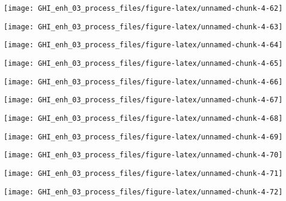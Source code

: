 \documentclass[
  10pt,
  a4paper,oneside]{article}
\begin{document}
\begin{center}\texttt{[image: GHI\_enh\_03\_process\_files/figure-latex/unnamed-chunk-4-62]} \end{center}

\begin{center}\texttt{[image: GHI\_enh\_03\_process\_files/figure-latex/unnamed-chunk-4-63]} \end{center}

\begin{center}\texttt{[image: GHI\_enh\_03\_process\_files/figure-latex/unnamed-chunk-4-64]} \end{center}

\begin{center}\texttt{[image: GHI\_enh\_03\_process\_files/figure-latex/unnamed-chunk-4-65]} \end{center}

\begin{center}\texttt{[image: GHI\_enh\_03\_process\_files/figure-latex/unnamed-chunk-4-66]} \end{center}

\begin{center}\texttt{[image: GHI\_enh\_03\_process\_files/figure-latex/unnamed-chunk-4-67]} \end{center}

\begin{center}\texttt{[image: GHI\_enh\_03\_process\_files/figure-latex/unnamed-chunk-4-68]} \end{center}

\begin{center}\texttt{[image: GHI\_enh\_03\_process\_files/figure-latex/unnamed-chunk-4-69]} \end{center}

\begin{center}\texttt{[image: GHI\_enh\_03\_process\_files/figure-latex/unnamed-chunk-4-70]} \end{center}

\begin{center}\texttt{[image: GHI\_enh\_03\_process\_files/figure-latex/unnamed-chunk-4-71]} \end{center}

\begin{center}\texttt{[image: GHI\_enh\_03\_process\_files/figure-latex/unnamed-chunk-4-72]} \end{center}
\end{document}
